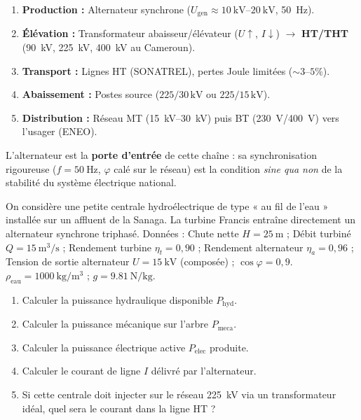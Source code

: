 \documentclass[11pt]{article}
\begin{document}
\begin{aretenir}
\begin{enumerate}
    \item \textbf{Production :} Alternateur synchrone ($U_{\text{gen}} \approx \SIrange{10}{20}{\kilo\volt}$, \SI{50}{\hertz}).
    \item \textbf{Élévation :} Transformateur abaisseur/élévateur ($U \uparrow$, $I \downarrow$) $\rightarrow$ \textbf{HT/THT} (\SI{90}{\kilo\volt}, \SI{225}{\kilo\volt}, \SI{400}{\kilo\volt} au Cameroun).
    \item \textbf{Transport :} Lignes HT (SONATREL), pertes Joule limitées ($\sim 3\text{--}5\%$).
    \item \textbf{Abaissement :} Postes source ($225/30\,\text{kV}$ ou $225/15\,\text{kV}$).
    \item \textbf{Distribution :} Réseau MT (\SIrange{15}{30}{\kilo\volt}) puis BT (\SI{230}{\volt}/\SI{400}{\volt}) vers l'usager (ENEO).
\end{enumerate}
L'alternateur est la \textbf{porte d'entrée} de cette chaîne : sa synchronisation rigoureuse ($f=\SI{50}{\hertz}$, $\varphi$ calé sur le réseau) est la condition \emph{sine qua non} de la stabilité du système électrique national.
\end{aretenir}

\begin{exercice}
On considère une petite centrale hydroélectrique de type « au fil de l'eau » installée sur un affluent de la Sanaga. La turbine Francis entraîne directement un alternateur synchrone triphasé.
Données : Chute nette $H = \SI{25}{\meter}$ ; Débit turbiné $Q = \SI{15}{\meter^3\per\second}$ ; Rendement turbine $\eta_t = 0,90$ ; Rendement alternateur $\eta_a = 0,96$ ; Tension de sortie alternateur $U = \SI{15}{\kilo\volt}$ (composée) ; $\cos\varphi = 0,9$.
$\rho_{\text{eau}} = \SI{1000}{\kilogram\per\meter^3}$ ; $g = \SI{9,81}{\newton\per\kilogram}$.
\begin{enumerate}
    \item Calculer la puissance hydraulique disponible $P_{\text{hyd}}$.
    \item Calculer la puissance mécanique sur l'arbre $P_{\text{meca}}$.
    \item Calculer la puissance électrique active $P_{\text{elec}}$ produite.
    \item Calculer le courant de ligne $I$ délivré par l'alternateur.
    \item Si cette centrale doit injecter sur le réseau \SI{225}{\kilo\volt} via un transformateur idéal, quel sera le courant dans la ligne HT ?
\end{enumerate}
\end{exercice}
\end{document}
